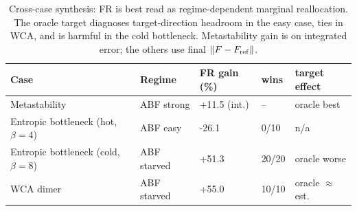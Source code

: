 \begin{table}[t]
\centering
\small
\caption{Cross-case synthesis: FR is best read as regime-dependent marginal reallocation. The oracle target diagnoses target-direction headroom in the easy case, ties in WCA, and is harmful in the cold bottleneck. Metastability gain is on integrated error; the others use final $\|F-F_{\rm ref}\|$.}
\label{tab:synthesis}
\begin{tabular}{lllll}
\toprule
Case & Regime & FR gain (\%) & wins & target effect \\
\midrule
Metastability & ABF strong & +11.5 (int.) & -- & oracle best \\
Entropic bottleneck (hot, $\beta{=}4$) & ABF easy & -26.1 & 0/10 & n/a \\
Entropic bottleneck (cold, $\beta{=}8$) & ABF starved & +51.3 & 20/20 & oracle worse \\
WCA dimer & ABF starved & +55.0 & 10/10 & oracle $\approx$ est. \\
\bottomrule
\end{tabular}
\end{table}
